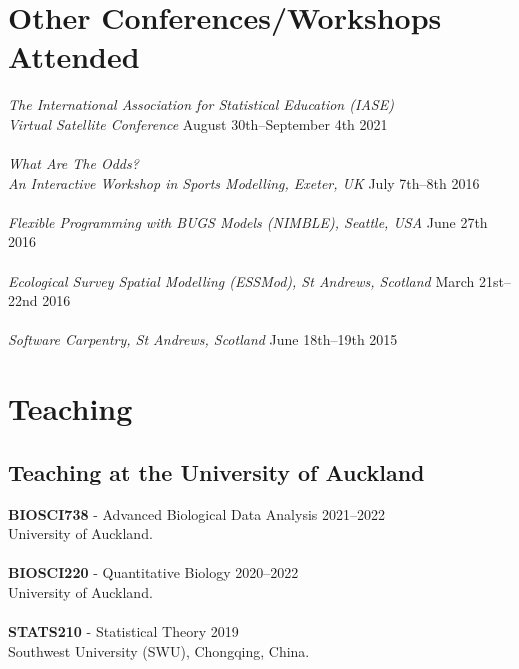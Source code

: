 \documentclass[10pt,letter]{article}
\begin{document}
\section*{Other Conferences/Workshops Attended}
\vspace{1mm}
{\sl The International Association for Statistical Education (IASE) \\ Virtual Satellite Conference} \hfill August 30th--September 4th 2021\\
\hdashrule[0.5ex]{4cm}{1pt}{1pt}\\
{\sl What Are The Odds? \\ An Interactive Workshop in Sports Modelling, Exeter, UK} \hfill July 7th--8th 2016\\
\hdashrule[0.5ex]{4cm}{1pt}{1pt}\\
{\sl Flexible Programming with BUGS Models (NIMBLE), Seattle, USA} \hfill June 27th 2016\\
\hdashrule[0.5ex]{4cm}{1pt}{1pt}\\
{\sl Ecological Survey Spatial Modelling (ESSMod), St Andrews, Scotland} \hfill March 21st--22nd 2016\\
 \hdashrule[0.5ex]{4cm}{1pt}{1pt}\\
 {\sl Software Carpentry, St Andrews, Scotland} \hfill June 18th--19th 2015\\
 \newpage
 \section*{Teaching}
\vspace{1mm}
 \subsection*{Teaching at the University of Auckland}
 \vspace{1mm}
 \textbf{BIOSCI738} - Advanced Biological Data Analysis \hfill{2021--2022} \\
 University of Auckland.\\
\hdashrule[0.5ex]{4cm}{1pt}{1pt}\\
 \textbf{BIOSCI220} - Quantitative Biology \hfill{2020--2022} \\
 University of Auckland.\\
\hdashrule[0.5ex]{4cm}{1pt}{1pt}\\
 \textbf{STATS210} - Statistical Theory \hfill{2019} \\
 Southwest University (SWU), Chongqing, China.
\end{document}
